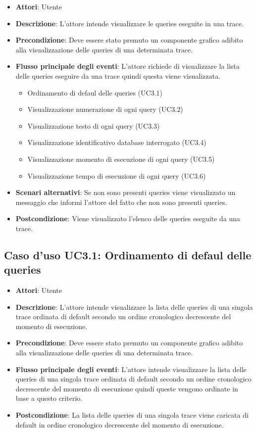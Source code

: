 \begin{itemize}
\item \textbf{Attori}: Utente
\item \textbf{Descrizione}: L'attore intende visualizzare le queries eseguite in una trace.
\item \textbf{Precondizione}: Deve essere stato premuto un componente grafico adibito alla visualizzazione delle queries di una determinata trace.
\item \textbf{Flusso principale degli eventi}: L'attore richiede di visualizzare la lista delle queries eseguire da una trace quindi questa viene visualizzata.
\begin{itemize}
\item Ordinamento di defaul delle queries (UC3.1)
\item Visualizzazione numerazione di ogni query (UC3.2)
\item Visualizzazione testo di ogni query (UC3.3)
\item Visualizzazione identificativo database interrogato (UC3.4)
\item Visualizzazione momento di esecuzione di ogni query (UC3.5)
\item Visualizzazione tempo di esecuzione di ogni query (UC3.6)
\end{itemize}
\item \textbf{Scenari alternativi}: Se non sono presenti queries viene visualizzato un messaggio che informi l'attore del fatto che non sono presenti queries.
\item \textbf{Postcondizione}: Viene visualizzato l'elenco delle queries eseguite da una trace.
\end{itemize}
\subsection{Caso d'uso UC3.1: Ordinamento di defaul delle queries}
\begin{itemize}
\item \textbf{Attori}: Utente
\item \textbf{Descrizione}: L'attore intende visualizzare la lista delle queries di una singola trace ordinata di default secondo un ordine cronologico decrescente del momento di esecuzione.
\item \textbf{Precondizione}: Deve essere stato premuto un componente grafico adibito alla visualizzazione delle queries di una determinata trace.
\item \textbf{Flusso principale degli eventi}: L'attore intende visualizzare la lista delle queries di una singola trace ordinata di default secondo un ordine cronologico decrescente del momento di esecuzione quindi queste vengono ordinate in base a questo criterio.
\item \textbf{Postcondizione}: La lista delle queries di una singola trace viene caricata di default in ordine cronologico decrescente del momento di esecuzione.
\end{itemize}
